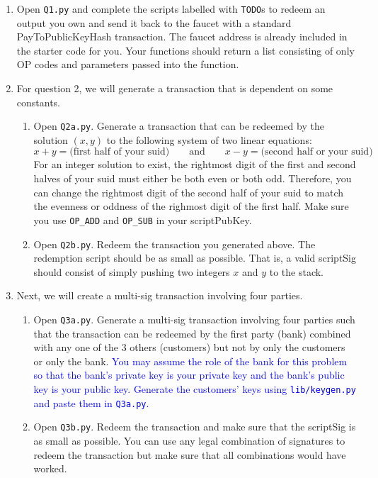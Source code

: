 \documentclass[11pt]{article}
\newenvironment{problems}
{\begin{enumerate}[label=\bfseries Exercise \arabic*.,align=left]}
{\end{enumerate}}
\begin{document}
\begin{problems}

\item
  Open \texttt{Q1.py} and complete the scripts labelled with \texttt{TODO}s
  to redeem an output you own and send it back to the faucet with a standard
  PayToPublicKeyHash transaction. The faucet address is already included in the starter code for you. Your functions should return a list consisting of only OP codes and parameters passed into the function.

\item For question 2, we will generate a transaction that is dependent on some constants.
    \begin{enumerate}
        \item Open \texttt{Q2a.py}. Generate a transaction that can be redeemed by the solution $(x,y)$ to the following system of two linear equations:
        \[
            x+y = \text{(first half of your suid)}  \qquad\text{and}\qquad
            x-y = \text{(second half or your suid)}
        \]
        For an integer solution to exist, the rightmost digit of the first and second halves of your suid must either be both even or both odd. Therefore, you can change the rightmost digit of the second half of your suid to match the evenness or oddness of the righmost digit of the first half. Make sure you use \texttt{OP\_ADD} and \texttt{OP\_SUB} in your scriptPubKey.
        \item Open \texttt{Q2b.py}. Redeem the transaction you generated above. The redemption script should be as small as possible. That is, a valid scriptSig should consist of simply pushing two integers $x$ and $y$ to the stack.
    \end{enumerate}

\item Next, we will create a multi-sig transaction involving four parties.
    \begin{enumerate}
        \item Open \texttt{Q3a.py}. Generate a multi-sig transaction involving four parties such that the transaction can be redeemed by the first party (bank) combined with any one of the 3 others (customers) but not by only the customers or only the bank. \textcolor{blue}{You may assume the role of the bank for this problem so that the bank's private key is your private key and the bank's public key is your public key. Generate the customers' keys using \texttt{lib/keygen.py} and paste them in \texttt{Q3a.py}.}
        \item Open \texttt{Q3b.py}. Redeem the transaction and make sure that the scriptSig is as small as possible. You can use any legal combination of signatures to redeem the transaction but make sure that all combinations would have worked.
    \end{enumerate}


\end{problems}
\end{document}
